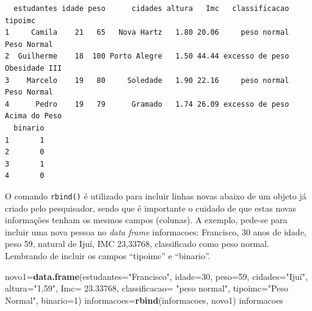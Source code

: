 \documentclass[12pt,portuguese,oneside]{book}
\newenvironment{Shaded}{\begin{snugshade}}{\end{snugshade}}
\newcommand{\KeywordTok}[1]{\textcolor[rgb]{0.13,0.29,0.53}{\textbf{#1}}}
\newcommand{\DataTypeTok}[1]{\textcolor[rgb]{0.13,0.29,0.53}{#1}}
\newcommand{\DecValTok}[1]{\textcolor[rgb]{0.00,0.00,0.81}{#1}}
\newcommand{\FloatTok}[1]{\textcolor[rgb]{0.00,0.00,0.81}{#1}}
\newcommand{\StringTok}[1]{\textcolor[rgb]{0.31,0.60,0.02}{#1}}
\newcommand{\CommentTok}[1]{\textcolor[rgb]{0.56,0.35,0.01}{\textit{#1}}}
\newcommand{\OperatorTok}[1]{\textcolor[rgb]{0.81,0.36,0.00}{\textbf{#1}}}
\newcommand{\NormalTok}[1]{#1}
\begin{document}
\begin{Shaded}
\end{Shaded}

\begin{verbatim}
  estudantes idade peso      cidades altura   Imc   classificacao       tipoimc
1     Camila    21   65   Nova Hartz   1.80 20.06     peso normal   Peso Normal
2  Guilherme    18  100 Porto Alegre   1.50 44.44 excesso de peso Obesidade III
3    Marcelo    19   80     Soledade   1.90 22.16     peso normal   Peso Normal
4      Pedro    19   79      Gramado   1.74 26.09 excesso de peso Acima do Peso
  binario
1       1
2       0
3       1
4       0
\end{verbatim}

O comando \texttt{rbind()} é utilizado para incluir linhas novas abaixo
de um objeto já criado pelo pesquisador, sendo que é importante o
cuidado de que estas novas informações tenham os mesmos campos
(colunas). A exemplo, pede-se para incluir uma nova pessoa no \emph{data
frame} informacoes: Francisco, 30 anos de idade, peso 59, natural de
Ijuí, IMC 23,33768, classificado como peso normal. Lembrando de incluir
os campos ``tipoimc'' e ``binario''.

\begin{Shaded}
\begin{Highlighting}[]
\NormalTok{novo1=}\KeywordTok{data.frame}\NormalTok{(}\DataTypeTok{estudantes=}\StringTok{"Francisco"}\NormalTok{, }\DataTypeTok{idade=}\DecValTok{30}\NormalTok{, }\DataTypeTok{peso=}\DecValTok{59}\NormalTok{, }
                 \DataTypeTok{cidades=}\StringTok{"Ijuí"}\NormalTok{, }
                 \DataTypeTok{altura=}\StringTok{"1,59"}\NormalTok{, }
                 \DataTypeTok{Imc=} \FloatTok{23.33768}\NormalTok{, }
                 \DataTypeTok{classificacao=} \StringTok{"peso normal"}\NormalTok{,}
                 \DataTypeTok{tipoimc=}\StringTok{"Peso Normal"}\NormalTok{, }
                 \DataTypeTok{binario=}\DecValTok{1}\NormalTok{)}
\NormalTok{informacoes=}\KeywordTok{rbind}\NormalTok{(informacoes, novo1)}
\NormalTok{informacoes}
\end{Highlighting}
\end{Shaded}
\end{document}
